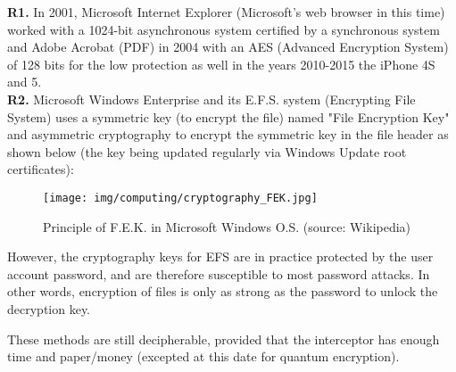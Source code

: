 		\begin{tcolorbox}[title=Remarks,colframe=black,arc=10pt]
		\textbf{R1.} In 2001, Microsoft Internet Explorer (Microsoft's web browser in this time) worked with a 1024-bit asynchronous system certified by a synchronous system and Adobe Acrobat (PDF) in 2004 with an AES (Advanced Encryption System) of 128 bits for the low protection as well in the years 2010-2015 the iPhone 4S and 5.\\
		
		\textbf{R2.} Microsoft Windows Enterprise and its E.F.S. system (Encrypting File System) uses a symmetric key (to encrypt the file) named  "File Encryption Key" and asymmetric cryptography to encrypt the symmetric key in the file header as shown below (the key being updated regularly via Windows Update root certificates):
		\begin{figure}[H]
			\centering
			\texttt{[image: img/computing/cryptography\_FEK.jpg]}
			\caption[Principle of F.E.K. in Microsoft Windows O.S.]{Principle of F.E.K. in Microsoft Windows O.S. (source: Wikipedia)}
		\end{figure}
		However, the cryptography keys for EFS are in practice protected by the user account password, and are therefore susceptible to most password attacks. In other words, encryption of files is only as strong as the password to unlock the decryption key.
		\end{tcolorbox}
		These methods are still decipherable, provided that the interceptor has enough time and paper/money (excepted at this date for quantum encryption).
		
